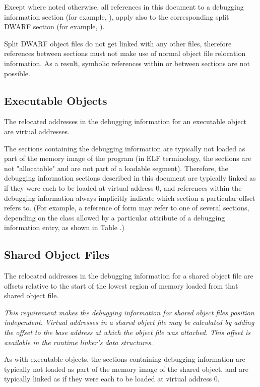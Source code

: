 Except where noted otherwise, all references in this document
to a debugging information section (for example, \dotdebuginfo),
apply also to the corresponding split DWARF section (for example,
\dotdebuginfodwo).

Split DWARF object files do not get linked with any other files,
therefore references between sections must not make use of
normal object file relocation information. As a result, symbolic
references within or between sections are not possible.

\subsection{Executable Objects}
\label{chap:executableobjects}
The relocated addresses in the debugging information for an
executable object are virtual addresses.

The sections containing the debugging information are typically
not loaded as part of the memory image of the program (in ELF
terminology, the sections are not "allocatable" and are not part
of a loadable segment). Therefore, the debugging information
sections described in this document are typically linked as if
they were each to be loaded at virtual address 0, and references
within the debugging information always implicitly indicate which
section a particular offset refers to. (For example, a reference
of form \DWFORMsecoffset{} may refer to one of several sections,
depending on the class allowed by a particular attribute of a
debugging information entry, as shown in 
Table .)

\subsection{Shared Object Files}
\label{datarep:sharedobjectfiles}
The relocated
addresses in the debugging information for a shared object file
are offsets relative to the start of the lowest region of
memory loaded from that shared object file.

\textit{This requirement makes the debugging information for
shared object files position independent.  Virtual addresses in a
shared object file may be calculated by adding the offset to the
base address at which the object file was attached. This offset
is available in the run\dash time linker\textquoteright s data structures.}

As with executable objects, the sections containing debugging
information are typically not loaded as part of the memory image
of the shared object, and are typically linked as if they were
each to be loaded at virtual address 0.

